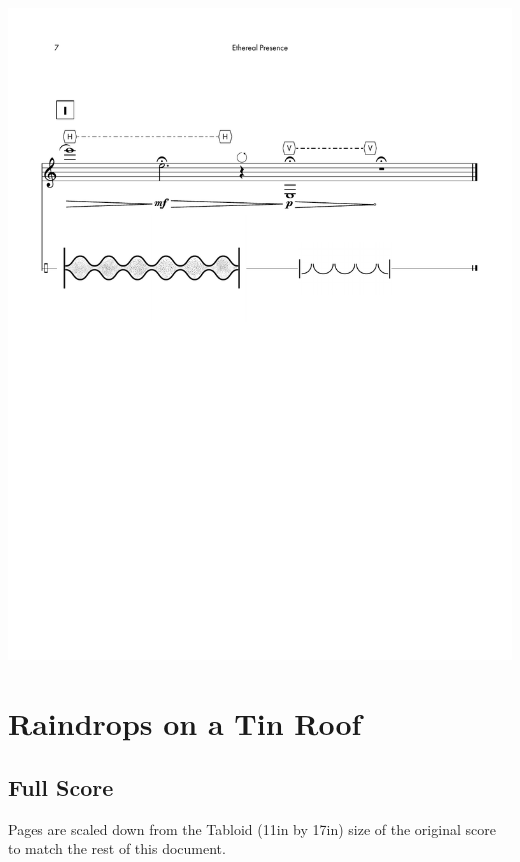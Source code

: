 \begin{center}
     \includegraphics[scale=0.75]{Scores/EPPart13.pdf}
\end{center}
\newpage

\section{Raindrops on a Tin Roof}

\subsection{Full Score}
Pages are scaled down from the Tabloid (11in by 17in) size of the original score to match the rest of this document. 



